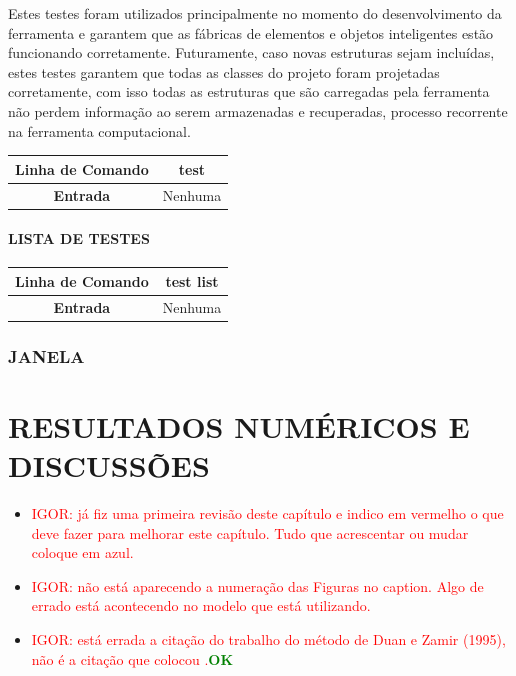 \documentclass[
        english,			
        brazil			        %
        ,<...>]{abntbibufjf}
\begin{document}
Estes testes foram utilizados principalmente no momento do desenvolvimento da ferramenta e garantem que as fábricas de elementos e objetos inteligentes estão funcionando corretamente. Futuramente, caso novas estruturas sejam incluídas, estes testes garantem que todas as classes do projeto foram projetadas corretamente, com isso todas as estruturas que são carregadas pela ferramenta não perdem informação ao serem armazenadas e recuperadas, processo recorrente na ferramenta computacional.

\begin{center}
	\begin{tabular}{|c|c|}
		\hline
		\textbf{Linha de Comando} & test \\
		\hline
		\textbf{Entrada} & Nenhuma \\
		\hline
	\end{tabular}
\end{center}

\subsubsection{LISTA DE TESTES}\label{sec:test list}



\begin{center}
	\begin{tabular}{|c|c|}
		\hline
		\textbf{Linha de Comando} & test list \\
		\hline
		\textbf{Entrada} & Nenhuma \\
		\hline
	\end{tabular}
\end{center}

\subsection{JANELA}\label{sec:janela}

\chapter{RESULTADOS NUMÉRICOS E DISCUSSÕES}

\begin{itemize}
	\item \textcolor{red}{IGOR: já fiz uma primeira revisão deste capítulo e indico em vermelho o que deve fazer para melhorar este capítulo. Tudo que acrescentar ou mudar coloque em azul.}
	\item \textcolor{red}{IGOR: não está aparecendo a numeração das Figuras no caption. Algo de errado está acontecendo no modelo que está utilizando.}
	\item \textcolor{red}{IGOR: está errada a citação do trabalho do método de Duan e Zamir (1995), não é a citação que colocou \cite{Duan}.}\textcolor{green}{\textbf{OK}}
\end{itemize}
\end{document}
